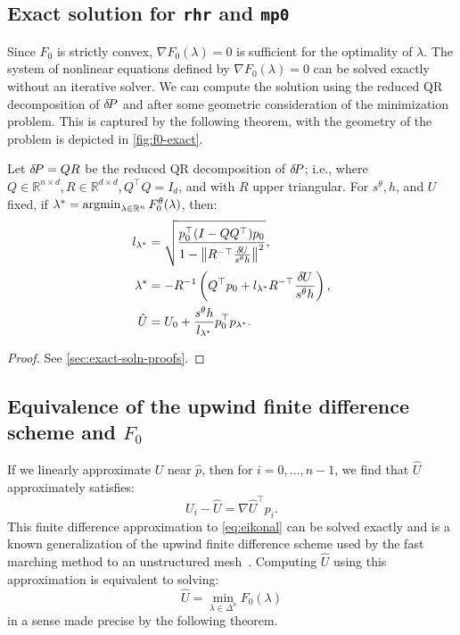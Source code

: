 \documentclass[sisc-eikonal.tex]{subfiles}
\begin{document}
\subsection{Exact solution for \texttt{rhr} and \texttt{mp0}}\label{ssec:exact-soln}

Since $F_0$ is strictly convex, $\nabla F_0(\lambda) = 0$ is
sufficient for the optimality of $\lambda$. The system of nonlinear
equations defined by $\nabla F_0(\lambda) = 0$ can be solved exactly
without an iterative solver. We can compute the solution using the
reduced QR decomposition of ${\delta \hspace{-0.14em} P}$ and after some geometric
consideration of the minimization problem. This is captured by the
following theorem, with the geometry of the problem is depicted in
\cref{fig:f0-exact}.

\begin{theorem}\label{thm:f0-exact}
  Let ${\delta \hspace{-0.14em} P} = QR$ be the reduced QR decomposition of ${\delta \hspace{-0.14em} P}$; i.e.,
  where
  $Q \in \mathbb{R}^{n \times d}, R \in \mathbb{R}^{d \times d},
  Q^\top Q = I_d$, and with $R$ upper triangular. For $s^\theta, h$,
  and $U$ fixed, if
  $\lambda^* = \operatorname{argmin}_{\lambda \in \mathbb{R}^n}
  F_0^\theta(\lambda)$, then:
  \begin{align}
    l_{\lambda^*} &= \sqrt{\frac{p_0^\top {(I - QQ^\top)} p_0}{1 - \norm{R^{-\top} \frac{\delU}{s^\theta h}}^2}},\label{eq:l-star-expression} \\
    \lambda^* &= -R^{-1} \parens{Q^\top p_0 + l_{\lambda^*} R^{-\top} \frac{\delU}{s^\theta h}},\label{eq:f0-exact-lambda} \\ 
    \hat{U} &= U_0 + \frac{s^\theta h}{l_{\lambda^*}} p_0^\top p_{\lambda^*}.\label{eq:f0-exact}
  \end{align}
\end{theorem}

\begin{proof}
  See \cref{sec:exact-soln-proofs}.
\end{proof}

\subsection{Equivalence of the upwind finite difference scheme and
  $F_0$}\label{ssec:equivalence}

If we linearly approximate $U$ near $\hat{p}$, then for
$i = 0, \hdots, n - 1$, we find that $\hat{U}$ approximately
satisfies:
\begin{equation}
  \label{eq:finite-differences}
  U_i - \hat{U} = \nabla \hat{U}^\top p_i.
\end{equation}
This finite difference approximation to \cref{eq:eikonal} can be
solved exactly and is a known generalization of the upwind finite
difference scheme used by the fast marching method to an unstructured
mesh~\cite{kimmel1998computing,sethian2000fast}. Computing $\hat{U}$
using this approximation is equivalent to solving:
\begin{equation}
  \hat{U} = \min_{\lambda \in \Delta^n} F_0(\lambda)
\end{equation}
in a sense made precise by the following theorem.
\end{document}
